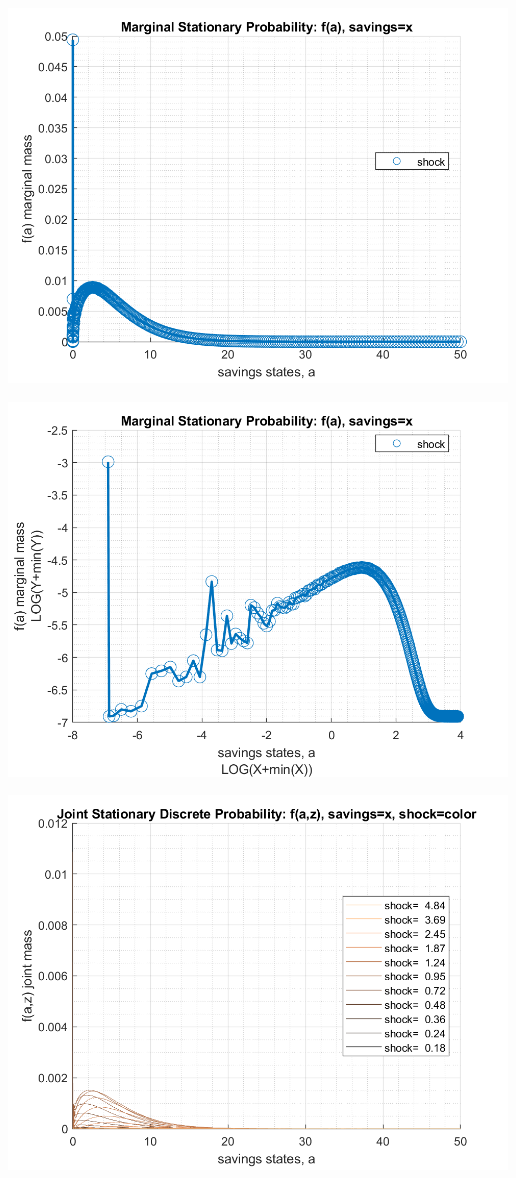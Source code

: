 \documentclass[
]{book}
\begin{document}
\includegraphics[width=5.20833in,height=\textheight]{img/fx_ds_az_cts_vec_images/figure_7.png}

\includegraphics[width=5.20833in,height=\textheight]{img/fx_ds_az_cts_vec_images/figure_8.png}

\includegraphics[width=5.20833in,height=\textheight]{img/fx_ds_az_cts_vec_images/figure_9.png}
\end{document}
